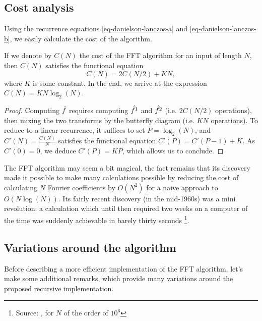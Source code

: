 \subsection{Cost analysis}
\label{sect2-analyze-cost-fft} 
 
Using the recurrence equations \eqref{eq-danielson-lanczos-a} and \eqref{eq-danielson-lanczos-b}, we easily calculate the cost of the algorithm.
 
\begin{prop}
 If we denote by $ C (N) $ the cost of the FFT algorithm for an input of length $N$, then $ C (N) $ satisfies the functional equation
\begin{equation*}
C (N) = 2 C (N / 2) + KN,
\end{equation*}
where $ K $ is some constant. In the end, we arrive at the expression $ C (N) = KN \log_2 (N) $.
\end{prop}
\begin{proof}
Computing $ \hat{f} $ requires computing $ \hat{f^1} $ and $ \hat{f^2} $ (i.e. $ 2 C (N / 2) $ operations), then mixing the two transforms by the butterfly diagram (i.e. $ KN $ operations). To reduce to a linear recurrence, it suffices to set $ P = \log_2 (N) $, and $ C'(N) = \frac{C (N)}{N} $ satisfies the functional equation $ C' (P) = C'(P-1) + K $. As $ C'(0) = 0 $, we deduce $ C' (P) = KP $, which allows us to conclude.
\end{proof}
The FFT algorithm may seem a bit magical, the fact remains that its discovery made it possible to make many calculations possible by reducing the cost of calculating $N$ Fourier coefficients by $ O(N^2) $ for a naive approach to $ O(N \log (N)) $. Its fairly recent discovery (in the mid-1960s) was a mini revolution: a calculation which until then required two weeks on a computer of the time was suddenly achievable in barely thirty seconds \footnote{Source: \cite{nr}, for $N$ of the order of $ 10^6 $}.
\subsection{Variations around the algorithm}
\label{sect2-variations-fft} 
 
Before describing a more efficient implementation of the FFT algorithm, let's make some additional remarks, which provide many variations around the proposed recursive implementation.
 
